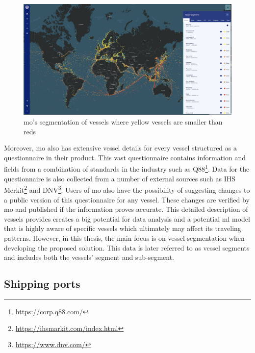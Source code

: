 \begin{figure}[htbp]  %
    \centering
    \includegraphics[width=1.0\textwidth]{figures/segment_map}
    \caption{\acrfull{mo}’s segmentation of vessels where yellow vessels are smaller than reds}
    \label{fig:segment_map}
\end{figure}

Moreover, \acrshort{mo} also has extensive vessel details for every vessel structured as a questionnaire in their product. This vast questionnaire contains information and fields from a combination of standards in the industry such as Q88\footnote{\url{https://corp.q88.com/}}. Data for the questionnaire is also collected from a number of external sources such as IHS Merkit\footnote{\url{https://ihsmarkit.com/index.html}} and DNV\footnote{\url{https://www.dnv.com/}}. Users of \acrshort{mo} also have the possibility of suggesting changes to a public version of this questionnaire for any vessel. These changes are verified by \acrshort{mo} and published if the information proves accurate. This detailed description of vessels provides creates a big potential for data analysis and a potential \acrshort{ml} model that is highly aware of specific vessels which ultimately may affect its traveling patterns. However, in this thesis, the main focus is on vessel segmentation when developing the proposed solution. This data is later referred to as vessel segments and includes both the vessels' segment and sub-segment.

\subsection{Shipping ports}
\label{sec:shipping_ports}

